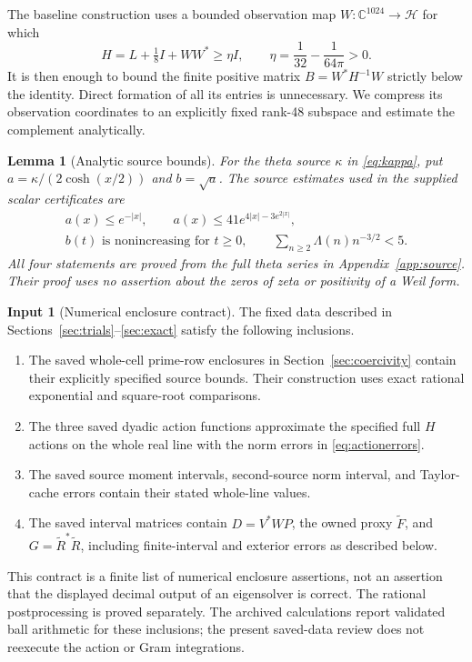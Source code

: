 \documentclass[11pt,a4paper]{article}
\numberwithin{equation}{section}
\newtheorem{lemma}[theorem]{Lemma}
\theoremstyle{definition}\newtheorem{definition}[theorem]{Definition}
\newtheorem{hypothesis}[theorem]{Input}
\theoremstyle{remark}\newtheorem{remark}[theorem]{Remark}
\newcommand{\HH}{\mathcal H}
\newcommand{\C}{\mathbb C}
\begin{document}
The baseline construction uses a bounded observation map $W:\C^{1024}\to\HH$ for which
\begin{equation}\label{eq:Hintro}
 H=L+\tfrac18I+WW^*\ge\eta I,
 \qquad \eta=\frac1{32}-\frac1{64\pi}>0.
\end{equation}
It is then enough to bound the finite positive matrix $B=W^*H^{-1}W$ strictly below the identity. Direct formation of all its entries is unnecessary. We compress its observation coordinates to an explicitly fixed rank-48 subspace and estimate the complement analytically.

\begin{lemma}[Analytic source bounds]\label{inp:source}
For the theta source $\kappa$ in \eqref{eq:kappa}, put
$a=\kappa/(2\cosh(x/2))$ and $b=\sqrt a$. The source estimates used in the supplied scalar certificates are
\begin{equation}\label{eq:sourceinput}
 \begin{gathered}
 a(x)\le e^{-|x|},\qquad a(x)\le41e^{4|x|-3e^{2|x|}},\\
 b(t)\text{ is nonincreasing for }t\ge0,\qquad
 \sum_{n\ge2}\Lambda(n)n^{-3/2}<5.
 \end{gathered}
\end{equation}
All four statements are proved from the full theta series in Appendix~\ref{app:source}. Their proof uses no assertion about the zeros of zeta or positivity of a Weil form.
\end{lemma}

\begin{hypothesis}[Numerical enclosure contract]\label{inp:numeric}
The fixed data described in Sections~\ref{sec:trials}--\ref{sec:exact} satisfy the following inclusions.
\begin{enumerate}[label=(\roman*),leftmargin=2em]
\item The saved whole-cell prime-row enclosures in Section~\ref{sec:coercivity} contain their explicitly specified source bounds. Their construction uses exact rational exponential and square-root comparisons.
\item The three saved dyadic action functions approximate the specified full $H$ actions on the whole real line with the norm errors in \eqref{eq:actionerrors}.
\item The saved source moment intervals, second-source norm interval, and Taylor-cache errors contain their stated whole-line values.
\item The saved interval matrices contain $D=V^*WP$, the owned proxy $\widetilde F$, and $G=\widetilde R^*\widetilde R$, including finite-interval and exterior errors as described below.
\end{enumerate}
This contract is a finite list of numerical enclosure assertions, not an assertion that the displayed decimal output of an eigensolver is correct. The rational postprocessing is proved separately. The archived calculations report validated ball arithmetic for these inclusions; the present saved-data review does not reexecute the action or Gram integrations.
\end{hypothesis}
\end{document}
